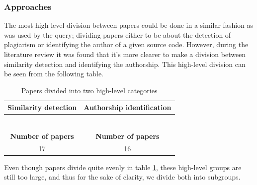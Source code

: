 \subsubsection{Approaches}

The most high level division between papers could be done in a similar fashion as was used by the
query; dividing papers either to be about the detection of plagiarism or identifying the author of a given source code. However, during the literature review it was found that it's more clearer to make a division between similarity detection and identifying the authorship. This high-level division can be seen from the following table.

\begin{table}[ht]
    \caption{Papers divided into two high-level categories}
    \label{table-highcateq}
    \centering
    \begin{tabular}{ | c | c | }
        
        \hline
        {\bf Similarity detection} & {\bf Authorship identification} \\ \hline
    
        \cite{AFAPLI2015, LICD2010, AASCPD2012} & \cite{SCAANN2017, ABEC2014, CAPSCAP2014}   \\
        \cite{Heblikar2015NormalizationBS, USCR2014, AIR2015} &  \cite{SCANG2007, RA:AE2010, EJPFSAI2004}\\
        \cite{OTIOLSS2015, BUAA2009, ramirez2015high} &  \cite{APASCAI2007, UCMHGAAI2007, ESHPFSCAC2008}\\
        \cite{Ohmann2015, TBCFPD2012, Fu2017WASTKAW} &  \cite{AIRTSCAA2009, TSUDIJSCAI2011, DNNSCAI2013} \\
        \cite{ASTMLPD2013, AAPSCDPTK2013, CPDPPD2013}    & \cite{SCAIUFL2013, SDNAIJSP2015, AISC2017} \\
        \cite{PACASCD2005, RCISCP2017} & \cite{ACSBPD2012} \\ \hline
        {\bf Number of papers} & {\bf Number of papers} \\ \hline
        17 & 16 \\ \hline
    \end{tabular}
\end{table}

\noindent
Even though papers divide quite evenly in table \ref{table-highcateq}, these high-level groups are still too large, and thus for the sake of clarity, we divide both into subgroups.

